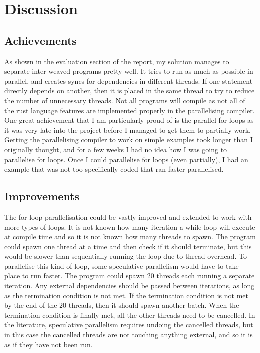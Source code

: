 \chapter{Discussion}
\section{Achievements}
As shown in the \hyperref[sec:evaluation]{evaluation section} of the report, my solution manages to separate inter-weaved programs pretty well. It tries to run as much as possible in parallel, and creates syncs for dependencies in different threads. If one statement directly depends on another, then it is placed in the same thread to try to reduce the number of unnecessary threads. Not all programs will compile as not all of the rust language features are implemented properly in the parallelising compiler. One great achievement that I am particularly proud of is the parallel for loops as it was very late into the project before I managed to get them to partially work. Getting the parallelising compiler to work on simple examples took longer than I originally thought, and for a few weeks I had no idea how I was going to parallelise for loops. Once I could parallelise for loops (even partially), I had an example that was not too specifically coded that ran faster parallelised.

\section{Improvements}
The for loop parallelisation could be vastly improved and extended to work with more types of loops. It is not known how many iteration a while loop will execute at compile time and so it is not known how many threads to spawn. The program could spawn one thread at a time and then check if it should terminate, but this would be slower than sequentially running the loop due to thread overhead. To parallelise this kind of loop, some speculative parallelism would have to take place to run faster. The program could spawn $20$ threads each running a separate iteration. Any external dependencies should be passed between iterations, as long as the termination condition is not met. If the termination condition is not met by the end of the $20$ threads, then it should spawn another batch. When the termination condition is finally met, all the other threads need to be cancelled. In the literature, speculative parallelism requires undoing the cancelled threads, but in this case the cancelled threads are not touching anything external, and so it is as if they have not been run.

